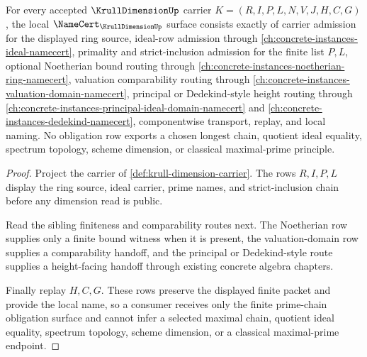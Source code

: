 \begin{theorem}\label{thm:krull-dimension-namecert-obligations}
For every accepted $\KrullDimensionUp$ carrier $K=(R,I,P,L,N,V,J,H,C,G)$, the local $\NameCert_{\KrullDimensionUp}$ surface consists exactly of carrier admission for the displayed ring source, ideal-row admission through \autoref{ch:concrete-instances-ideal-namecert}, primality and strict-inclusion admission for the finite list $P,L$, optional Noetherian bound routing through \autoref{ch:concrete-instances-noetherian-ring-namecert}, valuation comparability routing through \autoref{ch:concrete-instances-valuation-domain-namecert}, principal or Dedekind-style height routing through \autoref{ch:concrete-instances-principal-ideal-domain-namecert} and \autoref{ch:concrete-instances-dedekind-namecert}, componentwise transport, replay, and local naming. No obligation row exports a chosen longest chain, quotient ideal equality, spectrum topology, scheme dimension, or classical maximal-prime principle.
\end{theorem}
\begin{proof}
Project the carrier of \autoref{def:krull-dimension-carrier}. The rows $R,I,P,L$ display the ring source, ideal carrier, prime names, and strict-inclusion chain before any dimension read is public.

Read the sibling finiteness and comparability routes next. The Noetherian row supplies only a finite bound witness when it is present, the valuation-domain row supplies a comparability handoff, and the principal or Dedekind-style route supplies a height-facing handoff through existing concrete algebra chapters.

Finally replay $H,C,G$. These rows preserve the displayed finite packet and provide the local name, so a consumer receives only the finite prime-chain obligation surface and cannot infer a selected maximal chain, quotient ideal equality, spectrum topology, scheme dimension, or a classical maximal-prime endpoint.
\end{proof}

